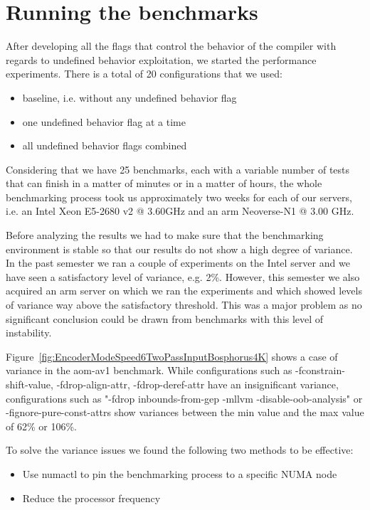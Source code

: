 \section{Running the benchmarks}

After developing all the flags that control the behavior of the compiler with
regards to undefined behavior exploitation, we started the performance
experiments. There is a total of 20 configurations that we used:
\begin{itemize}
  \item baseline, i.e. without any undefined behavior flag
  \item one undefined behavior flag at a time
  \item all undefined behavior flags combined
\end{itemize}

Considering that we have 25 benchmarks, each with a variable number of tests
that can finish in a matter of minutes or in a matter of hours, the whole
benchmarking process took us approximately two weeks for each of our servers,
i.e. an Intel Xeon E5-2680 v2 @ 3.60GHz and an arm Neoverse-N1 @ 3.00 GHz.

Before analyzing the results we had to make sure that the benchmarking
environment is stable so that our results do not show a high degree of variance.
In the past semester we ran a couple of experiments on the Intel server and we
have seen a satisfactory level of variance, e.g. 2\%. However, this semester we
also acquired an arm server on which we ran the experiments and which showed
levels of variance way above the satisfactory threshold. This was a major
problem as no significant conclusion could be drawn from benchmarks with this
level of instability.

Figure~\ref{fig:EncoderModeSpeed6TwoPassInputBosphorus4K} shows a case of
variance in the aom-av1 benchmark. While configurations such as
-fconstrain-shift-value, -fdrop-align-attr, -fdrop-deref-attr have an
insignificant variance, configurations such as "-fdrop inbounds-from-gep -mllvm
-disable-oob-analysis" or -fignore-pure-const-attrs show variances between the
min value and the max value of 62\% or 106\%.

To solve the variance issues we found the following two methods to be effective:
\begin{itemize}
  \item Use numactl to pin the benchmarking process to a specific NUMA node
  \item Reduce the processor frequency
\end{itemize}

